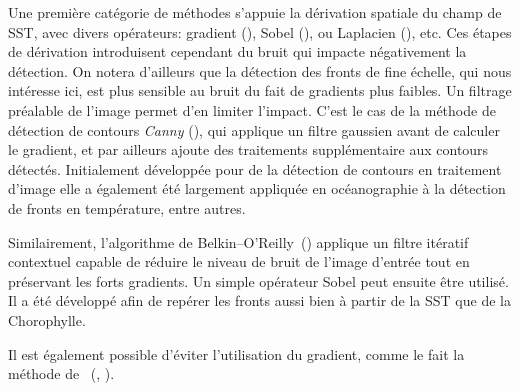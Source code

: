 Une première catégorie de méthodes s'appuie la dérivation spatiale du champ de SST, avec divers opérateurs: gradient (\cite{kazmin_1996,moore_1997,kostianoy_2004}), Sobel (\cite{sauter_1994}), ou Laplacien (\cite{holyer_1989}), etc.
Ces étapes de dérivation introduisent cependant du bruit qui impacte négativement la détection.
On notera d'ailleurs que la détection des fronts de fine échelle, qui nous intéresse ici, est plus sensible au bruit du fait de gradients plus faibles.
Un filtrage préalable de l'image permet d'en limiter l'impact.
C'est le cas de la méthode de détection de contours \emph{Canny} (\cite{canny_1986}), qui applique un filtre gaussien avant de calculer le gradient, et par ailleurs ajoute des traitements supplémentaire aux contours détectés.
Initialement développée pour de la détection de contours en traitement d'image  elle a également été largement appliquée en océanographie à la détection de fronts en température, entre autres.

Similairement, l'algorithme de Belkin--O'Reilly~(\cite{belkin_2009}) applique un filtre itératif contextuel capable de réduire le niveau de bruit de l'image d'entrée tout en préservant les forts gradients.
Un simple opérateur Sobel peut ensuite être utilisé.
Il a été développé afin de repérer les fronts aussi bien à partir de la SST que de la Chorophylle.

Il est également possible d'éviter l'utilisation du gradient, comme le fait la méthode de ~(, \cite{cayula_1992}).

